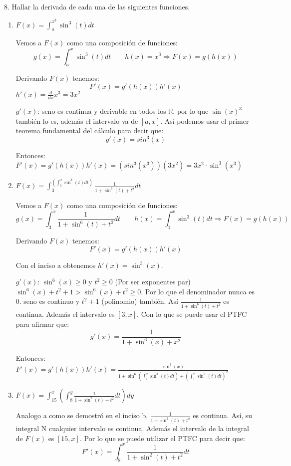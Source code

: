 \documentclass[12pt]{article}
\begin{document}
8. Hallar la derivada de cada una de las siguientes funciones.

\begin{enumerate}[\hspace{9px} a)]
    \item \(F(x)=\displaystyle\int_{a}^{x^3}\sin^3(t)dt\)\medskip
    
        Vemos a \(F(x)\) como una composici\'on de funciones:
        \[g(x)=\int_{a}^{x}\sin^3(t)dt \qquad h(x)=x^3 \Longrightarrow F(x)=g(h(x))\]

        Derivando \(F(x)\) tenemos:
        \[F'(x)=g'(h(x))h'(x)\]
        \(h'(x)=\frac{d}{dx}x^3=3x^2\)\medskip

        \(g'(x)\): seno es continua y derivable en todos los \(\mathbb{R}\), por lo que \(\sin(x)^3\) tambi\'en lo es, adem\'as el intervalo va de \([a,x]\). As\'i podemos usar el primer teorema fundamental del c\'alculo para decir que:
        \[g'(x) = sin^3(x)\]

        Entonces: \(F'(x)=g'(h(x))h'(x) = (sin^3(x^3))(3x^2) = 3x^2\cdot\sin^3(x^3)\)\medskip
        
    \item \(F(x)=\displaystyle\int_{3}^{\left(\displaystyle\int_{1}^{x}\sin^3(t)dt\right)}\frac{1}{1+\sin^6(t)+t^2}dt\)\medskip
    
        Vemos a \(F(x)\) como una composici\'on de funciones:
        \[g(x)=\int_{3}^{x}\frac{1}{1+\sin^6(t)+t^2}dt \qquad h(x)=\int_{1}^{x}\sin^3(t)dt \Longrightarrow F(x)=g(h(x))\]

        Derivando \(F(x)\) tenemos:
        \[F'(x)=g'(h(x))h'(x)\]

        Con el inciso a obtenemos \(h'(x) = \sin^3(x)\).\medskip

        \(g'(x)\): \(\sin^6(x)\geq0\) y \(t^2\geq0\) (Por ser exponentes par) \(\sin^6(x)+t^2+1>\sin^6(x)+t^2\geq0\). Por lo que el denominador nunca es 0. seno es continuo y \(t^2+1\) (polinomio) tambi\'en. As\'i \(\frac{1}{1+\sin^6(t)+t^2}\) es continua. Adem\'as el intervalo es \([3,x]\). Con lo que se puede usar el PTFC para afirmar que:
        \[g'(x) = \frac{1}{1+\sin^6(x)+x^2}\]

        Entonces: \(\displaystyle F'(x) = g'(h(x))h'(x) = \frac{\sin^3(x)}{1+\sin^6\left(\int_{1}^{x}\sin^3(t)dt\right)+\left(\int_{1}^{x}\sin^3(t)dt\right)^2}\)\medskip

    \item \(F(x)=\displaystyle\int_{15}^{x}\left(\int_{8}^{y}\frac{1}{1+\sin^2(t)+t^2}dt\right)dy\)\medskip
    
        Analogo a como se demostr\'o en el inciso b, \(\displaystyle\frac{1}{1+\sin^2(t)+t^2}\) es continua. As\'i, su integral N cualquier intervalo es continua. Adem\'as el intervalo de la integral de \(F(x)\) es \([15,x]\). Por lo que se puede utilizar el PTFC para decir que:
        \[F'(x) = \int_{8}^{x}\frac{1}{1+\sin^2(t)+t^2}dt\]

\end{enumerate}
\end{document}
